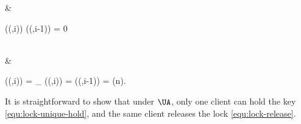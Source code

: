 \begin{Formulae}
& \begin{Formula}
\ValOf(\kvs(\key,i))  \iff \ValOf(\kvs(\key,i-1)) = 0
\label{equ:lock-unique-hold}
\end{Formula}
\\ & \begin{Formula}
\ValOf(\kvs(\key,i)) = _\cl \implies {} \WtOf(\kvs(\key,i)) = \WtOf(\kvs(\key,i-1)) = \txid[\cl](n).
\label{equ:lock-release}
\end{Formula}
\end{Formulae}

It is straightforward to show that under \( \UA \), 
only one client can hold the key \cref{equ:lock-unique-hold},
and the same client releases the lock \cref{equ:lock-release}.

